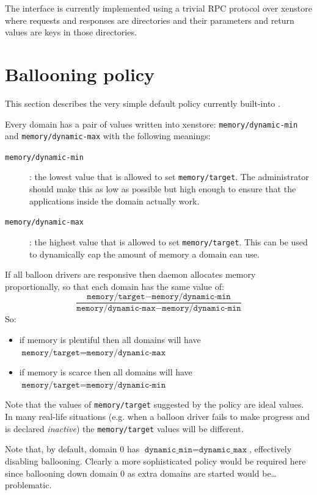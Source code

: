 \documentclass{article}
\begin{document}
The interface is currently implemented using a trivial RPC protocol over xenstore where requests and responses are directories and their parameters and return values are keys in those directories.

\section{Ballooning policy}
\label{Ballooning policy}
This section describes the very simple default policy currently built-into \squeezed{}.

Every domain has a pair of values written into xenstore: \texttt{memory/dynamic-min} and \texttt{memory/dynamic-max} with the following meanings:
\begin{description}
\item[\texttt{memory/dynamic-min}]: the lowest value that \squeezed{} is allowed to set \texttt{memory/target}. The administrator should make this as low as possible but high enough to ensure that the applications inside the domain actually work.
\item[\texttt{memory/dynamic-max}]: the highest value that \squeezed{} is allowed to set \texttt{memory/target}. This can be used to dynamically cap the amount of memory a domain can use.
\end{description}
If all balloon drivers are responsive then \squeezed{} daemon allocates memory proportionally, so that each domain has the same value of:
\[
\frac{
\texttt{memory/target}-\texttt{memory/dynamic-min}
}{
\texttt{memory/dynamic-max}-\texttt{memory/dynamic-min}
}
\]
So:
\begin{itemize}
\item if memory is plentiful then all domains will have $\texttt{memory/target}=\texttt{memory/dynamic-max}$
\item if memory is scarce then all domains will have $\texttt{memory/target}=\texttt{memory/dynamic-min}$
\end{itemize}
Note that the values of \texttt{memory/target} suggested by the policy are ideal values. In many real-life situations (e.g. when a balloon driver fails to make progress and is declared {\em inactive}) the \texttt{memory/target} values will be different.

Note that, by default, domain 0 has $\texttt{dynamic\_min}=\texttt{dynamic\_max}$, effectively disabling ballooning.  Clearly a more sophisticated policy would be required here since ballooning down domain 0 as extra domains are started would be\ldots{} problematic.
\end{document}
